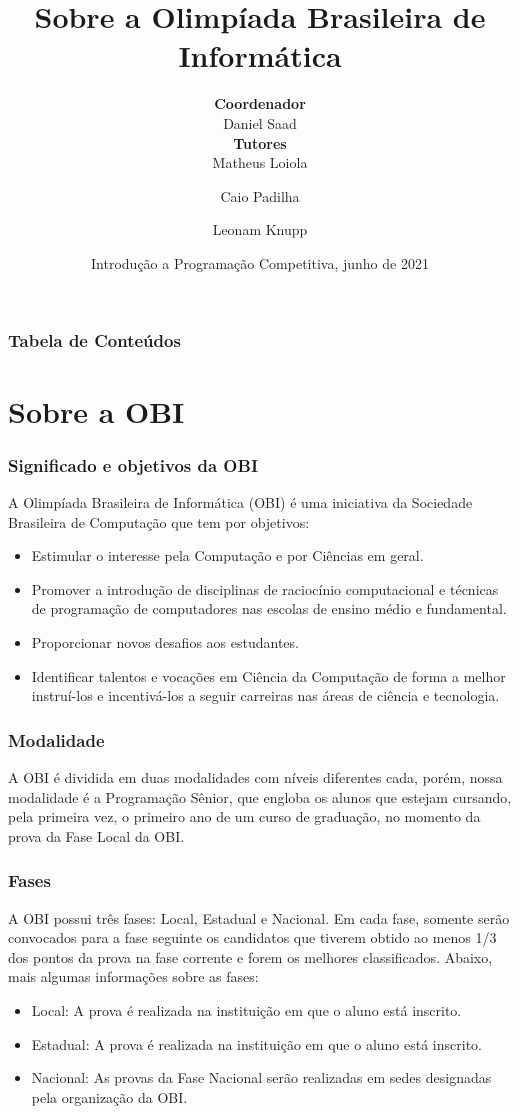 \documentclass{beamer}
\title[Sobre a OBI] %
{Sobre a Olimpíada Brasileira de Informática}
\author{\textbf{Coordenador}\\Daniel Saad\\
\textbf{Tutores}\\Matheus Loiola\and Caio Padilha \and Leonam Knupp}
\institute[IFB] %
\date[IFB, 2022] %
{Introdução a Programação Competitiva, junho de 2021}
\begin{document}
\frame{\titlepage}


\begin{frame}
\frametitle{Tabela de Conteúdos}
\tableofcontents
\end{frame}


\section{Sobre a OBI}

\begin{frame}
\frametitle{Significado e objetivos da OBI}
A Olimpíada Brasileira de Informática (OBI) é uma iniciativa da Sociedade Brasileira de Computação que tem por objetivos:

\begin{itemize}
    \item<1-> Estimular o interesse pela Computação e por Ciências em geral.
    \item<2-> Promover a introdução de disciplinas de raciocínio computacional e técnicas de programação de computadores nas escolas de ensino médio e fundamental. 
    \item<3-> Proporcionar novos desafios aos estudantes. 
    \item<4-> Identificar talentos e vocações em Ciência da Computação de forma a melhor instruí-los e incentivá-los a seguir carreiras nas áreas de ciência e tecnologia. 
\end{itemize}
\end{frame}

\begin{frame}
\frametitle{Modalidade}
A OBI é dividida em duas modalidades com níveis diferentes cada, porém, nossa modalidade é a Programação Sênior, que engloba os alunos que estejam cursando, pela primeira vez, o primeiro ano de um curso de graduação, no momento da prova da Fase Local da OBI.
\end{frame}


\begin{frame}
\frametitle{Fases}
A OBI possui três fases: Local, Estadual e Nacional. Em cada fase, somente serão convocados para a fase seguinte os candidatos que tiverem obtido ao menos 1/3 dos pontos da prova na fase corrente e forem os melhores classificados. Abaixo, mais algumas informações sobre as fases:

\begin{itemize}
    \item<1-> Local: A prova é realizada na instituição em que o aluno está inscrito. 
    \item<2-> Estadual: A prova é realizada na instituição em que o aluno está inscrito. 
    \item<3-> Nacional: As provas da Fase Nacional serão realizadas em sedes designadas pela organização da OBI. 
\end{itemize}
\end{frame}
\end{document}
